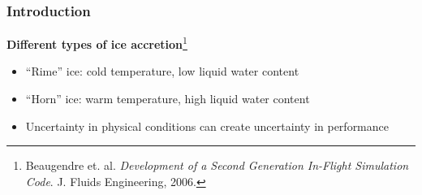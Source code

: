 \documentclass[9pt]{beamer}
\begin{document}
\begin{frame}
\frametitle{Introduction}
\label{sec-1-3}

\textbf{Different types of ice accretion}\footnote{Beaugendre et. al. \emph{Development of a Second Generation In-Flight Simulation Code}. J. Fluids Engineering, 2006.
 }
\begin{itemize}
\item ``Rime'' ice: cold temperature, low liquid water content
\item ``Horn'' ice: warm temperature, high liquid water content
\item Uncertainty in physical conditions can create uncertainty in performance
\end{itemize}

\vspace*{-0.0cm}\begin{figure}
 
\end{figure}
\end{frame}
\end{document}

